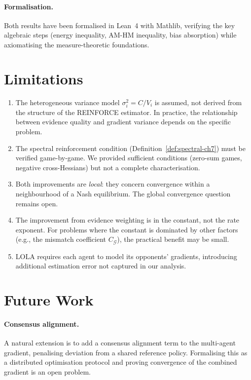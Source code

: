 \paragraph{Formalisation.} Both results have been formalised in Lean~4 with Mathlib, verifying the key algebraic steps (energy inequality, AM-HM inequality, bias absorption) while axiomatising the measure-theoretic foundations.

\section{Limitations}

\begin{enumerate}
    \item The heterogeneous variance model $\sigma_i^2 = C/V_i$ is assumed, not derived from the structure of the REINFORCE estimator. In practice, the relationship between evidence quality and gradient variance depends on the specific problem.
    \item The spectral reinforcement condition (Definition~\ref{def:spectral-ch7}) must be verified game-by-game. We provided sufficient conditions (zero-sum games, negative cross-Hessians) but not a complete characterisation.
    \item Both improvements are \emph{local}: they concern convergence within a neighbourhood of a Nash equilibrium. The global convergence question remains open.
    \item The improvement from evidence weighting is in the constant, not the rate exponent. For problems where the constant is dominated by other factors (e.g., the mismatch coefficient $C_\mathcal{G}$), the practical benefit may be small.
    \item LOLA requires each agent to model its opponents' gradients, introducing additional estimation error not captured in our analysis.
\end{enumerate}

\section{Future Work}

\paragraph{Consensus alignment.} A natural extension is to add a consensus alignment term to the multi-agent gradient, penalising deviation from a shared reference policy. Formalising this as a distributed optimisation protocol and proving convergence of the combined gradient is an open problem.


